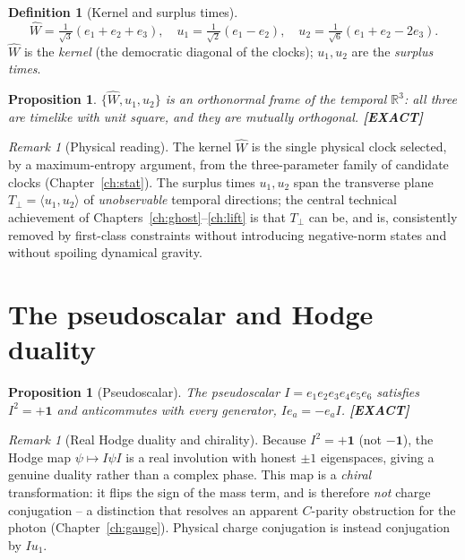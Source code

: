 \documentclass[11pt,oneside]{book}
\newcommand{\Wh}{\hat{W}}                         %
\newcommand{\RR}{\mathbb{R}}
\newcommand{\status}[1]{{\sffamily\bfseries\color{statuscol}[#1]}}
\theoremstyle{plain}
\newtheorem{proposition}[theorem]{Proposition}
\theoremstyle{definition}
\newtheorem{definition}[theorem]{Definition}
\theoremstyle{remark}
\newtheorem{remark}[theorem]{Remark}
\begin{document}
\begin{definition}[Kernel and surplus times]
\label{def:kernel}
\[
  \Wh=\tfrac{1}{\sqrt3}(e_1+e_2+e_3),\quad
  u_1=\tfrac{1}{\sqrt2}(e_1-e_2),\quad
  u_2=\tfrac{1}{\sqrt6}(e_1+e_2-2e_3).
\]
$\Wh$ is the \emph{kernel} (the democratic diagonal of the clocks); $u_1,u_2$ are
the \emph{surplus times}.
\end{definition}

\begin{proposition}
\label{prop:frame}
$\{\Wh,u_1,u_2\}$ is an orthonormal frame of the temporal $\RR^3$: all three are
timelike with unit square, and they are mutually orthogonal. \status{EXACT}
\end{proposition}

\begin{remark}[Physical reading]
The kernel $\Wh$ is the single physical clock selected, by a maximum-entropy
argument, from the three-parameter family of candidate clocks
(Chapter~\ref{ch:stat}). The surplus times $u_1,u_2$ span the transverse plane
$T_\perp=\langle u_1,u_2\rangle$ of \emph{unobservable} temporal directions; the
central technical achievement of Chapters~\ref{ch:ghost}--\ref{ch:lift} is that
$T_\perp$ can be, and is, consistently removed by first-class constraints without
introducing negative-norm states and without spoiling dynamical gravity.
\end{remark}

\section{The pseudoscalar and Hodge duality}
\label{sec:pseudoscalar}

\begin{proposition}[Pseudoscalar]
\label{prop:pseudo}
The pseudoscalar $I=e_1e_2e_3e_4e_5e_6$ satisfies $I^2=+\mathbf 1$ and
anticommutes with every generator, $Ie_a=-e_aI$. \status{EXACT}
\end{proposition}

\begin{remark}[Real Hodge duality and chirality]
Because $I^2=+\mathbf 1$ (not $-\mathbf 1$), the Hodge map $\psi\mapsto I\psi I$ is a
real involution with honest $\pm1$ eigenspaces, giving a genuine duality rather
than a complex phase. This map is a \emph{chiral} transformation: it flips the
sign of the mass term, and is therefore \emph{not} charge conjugation -- a
distinction that resolves an apparent $C$-parity obstruction for the photon
(Chapter~\ref{ch:gauge}). Physical charge conjugation is instead conjugation by
$I u_1$.
\end{remark}
\end{document}
